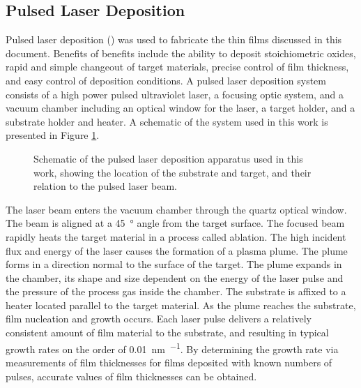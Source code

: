 \documentclass[12pt,%
              twoside,
               letterpaper]{uiothesis}
\begin{document}
\subsection{Pulsed Laser Deposition}
\label{subsec:exp.pld}


Pulsed laser deposition () was used to fabricate the thin films discussed in
this document. Benefits of  benefits include the ability to deposit
stoichiometric oxides, rapid and simple changeout of target materials, precise control of
film thickness, and easy control of deposition conditions.\cite{Chrisey:1994ta} A pulsed
laser deposition system consists of a high power pulsed ultraviolet laser, a focusing
optic system, and a vacuum chamber including an optical window for the laser, a target
holder, and a substrate holder and heater. A schematic of the system used in this work is
presented in Figure \ref{fig:pldsetup}.
\begin{figure}[b]
	\caption[Schematic of pulsed laser deposition apparatus]{%
		Schematic of the pulsed laser deposition apparatus used in 
		this work, showing the location of the substrate and target, 
		and their relation to the pulsed laser beam.}
	\label{fig:pldsetup}
\end{figure}
The laser  beam enters the vacuum chamber through the quartz optical window. The beam is
aligned at a \SI{45}{\degree} angle from the target surface. The focused beam rapidly
heats the target material in a process called ablation. The high incident flux and energy
of the laser causes the formation of a plasma plume. The plume forms in a direction normal
to the surface of the target. The plume expands in the chamber, its shape and size
dependent on the energy of the laser pulse and the pressure of the process gas inside the
chamber. The substrate is affixed to a heater located parallel to the target material. As
the plume reaches the substrate, film nucleation and growth occurs. Each laser pulse
delivers a relatively consistent amount of film material to the substrate, and resulting
in typical growth rates on the order of \SI{0.01}{\nano\meter\per\pulse}. By determining
the growth rate via measurements of film thicknesses for films deposited with known
numbers of pulses, accurate values of film thicknesses can be obtained.
\end{document}
